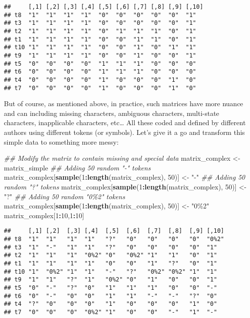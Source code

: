 \documentclass[
]{book}
\newenvironment{Shaded}{\begin{snugshade}}{\end{snugshade}}
\newcommand{\CommentTok}[1]{\textcolor[rgb]{0.56,0.35,0.01}{\textit{#1}}}
\newcommand{\DecValTok}[1]{\textcolor[rgb]{0.00,0.00,0.81}{#1}}
\newcommand{\KeywordTok}[1]{\textcolor[rgb]{0.13,0.29,0.53}{\textbf{#1}}}
\newcommand{\NormalTok}[1]{#1}
\newcommand{\OperatorTok}[1]{\textcolor[rgb]{0.81,0.36,0.00}{\textbf{#1}}}
\newcommand{\StringTok}[1]{\textcolor[rgb]{0.31,0.60,0.02}{#1}}
\begin{document}
\begin{verbatim}
##     [,1] [,2] [,3] [,4] [,5] [,6] [,7] [,8] [,9] [,10]
## t8  "1"  "1"  "1"  "1"  "0"  "0"  "0"  "0"  "0"  "1"  
## t3  "1"  "1"  "1"  "1"  "0"  "0"  "0"  "0"  "0"  "1"  
## t2  "1"  "1"  "1"  "1"  "0"  "1"  "1"  "1"  "0"  "1"  
## t1  "1"  "1"  "1"  "1"  "0"  "0"  "1"  "1"  "0"  "1"  
## t10 "1"  "1"  "1"  "1"  "0"  "0"  "1"  "0"  "1"  "1"  
## t9  "1"  "1"  "1"  "1"  "0"  "0"  "1"  "0"  "0"  "1"  
## t5  "0"  "0"  "0"  "0"  "1"  "1"  "1"  "0"  "0"  "0"  
## t6  "0"  "0"  "0"  "0"  "1"  "1"  "1"  "0"  "0"  "0"  
## t4  "0"  "0"  "0"  "0"  "1"  "0"  "0"  "0"  "1"  "0"  
## t7  "0"  "0"  "0"  "0"  "1"  "0"  "0"  "0"  "1"  "0"
\end{verbatim}

But of course, as mentioned above, in practice, such matrices have more nuance and can including missing characters, ambiguous characters, multi-state characters, inapplicable characters, etc\ldots{}
All these coded and defined by different authors using different tokens (or symbols).
Let's give it a go and transform this simple data to something more messy:

\begin{Shaded}
\begin{Highlighting}[]
\CommentTok{\#\# Modify the matrix to contain missing and special data}
\NormalTok{matrix\_complex \textless{}{-}}\StringTok{ }\NormalTok{matrix\_simple}
\CommentTok{\#\# Adding 50 random "{-}" tokens}
\NormalTok{matrix\_complex[}\KeywordTok{sample}\NormalTok{(}\DecValTok{1}\OperatorTok{:}\KeywordTok{length}\NormalTok{(matrix\_complex), }\DecValTok{50}\NormalTok{)] \textless{}{-}}\StringTok{ "{-}"}
\CommentTok{\#\# Adding 50 random "?" tokens}
\NormalTok{matrix\_complex[}\KeywordTok{sample}\NormalTok{(}\DecValTok{1}\OperatorTok{:}\KeywordTok{length}\NormalTok{(matrix\_complex), }\DecValTok{50}\NormalTok{)] \textless{}{-}}\StringTok{ "?"}
\CommentTok{\#\# Adding 50 random "0\%2" tokens}
\NormalTok{matrix\_complex[}\KeywordTok{sample}\NormalTok{(}\DecValTok{1}\OperatorTok{:}\KeywordTok{length}\NormalTok{(matrix\_complex), }\DecValTok{50}\NormalTok{)] \textless{}{-}}\StringTok{ "0\%2"}
\NormalTok{matrix\_complex[}\DecValTok{1}\OperatorTok{:}\DecValTok{10}\NormalTok{,}\DecValTok{1}\OperatorTok{:}\DecValTok{10}\NormalTok{]}
\end{Highlighting}
\end{Shaded}

\begin{verbatim}
##     [,1] [,2]  [,3] [,4]  [,5]  [,6]  [,7]  [,8]  [,9] [,10]
## t8  "1"  "1"   "1"  "1"   "?"   "0"   "0"   "0"   "0"  "0%2"
## t3  "1"  "-"   "1"  "1"   "?"   "0"   "0"   "0"   "0"  "1"  
## t2  "1"  "1"   "1"  "0%2" "0"   "0%2" "1"   "1"   "0"  "1"  
## t1  "1"  "1"   "1"  "1"   "0"   "0"   "1"   "?"   "0"  "1"  
## t10 "1"  "0%2" "1"  "1"   "-"   "?"   "0%2" "0%2" "1"  "1"  
## t9  "1"  "1"   "?"  "1"   "0%2" "0"   "1"   "0"   "0"  "1"  
## t5  "0"  "-"   "?"  "0"   "1"   "1"   "1"   "0"   "0"  "-"  
## t6  "0"  "-"   "0"  "0"   "1"   "1"   "-"   "-"   "?"  "0"  
## t4  "?"  "0"   "0"  "0"   "1"   "0"   "0"   "0"   "1"  "0"  
## t7  "0"  "0"   "0"  "0%2" "1"   "0"   "0"   "-"   "1"  "-"
\end{verbatim}
\end{document}

